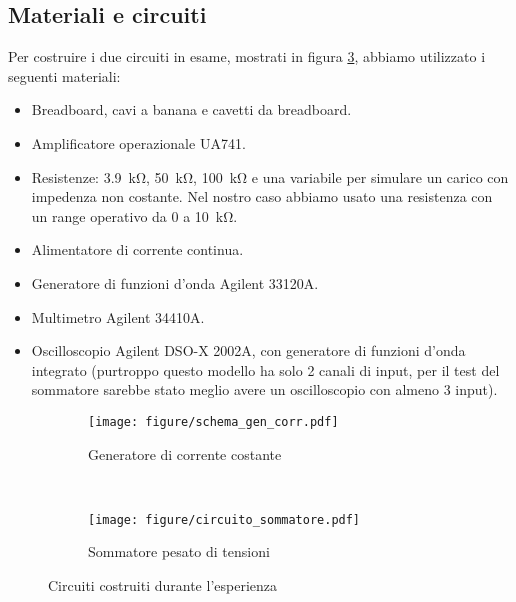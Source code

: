 \subsection{Materiali e circuiti}

Per costruire i due circuiti in esame, mostrati in figura \ref{fig:circuits1},
abbiamo utilizzato i seguenti materiali:

\begin{itemize}
    \item{Breadboard, cavi a banana e cavetti da breadboard.}
    \item{Amplificatore operazionale UA741.}
    \item{Resistenze: \SI{3.9}{\kilo\ohm}, \SI{50}{\kilo\ohm}, \SI{100}{\kilo\ohm}
        e una variabile per simulare un carico con impedenza non costante. Nel nostro caso abbiamo
        usato una resistenza con un range operativo da 0 a \SI{10}{\kilo\ohm}.}
    \item{Alimentatore di corrente continua.}
    \item{Generatore di funzioni d'onda Agilent 33120A.}
    \item{Multimetro Agilent 34410A.}
    \item{Oscilloscopio Agilent DSO-X 2002A, con generatore di funzioni d'onda integrato
        (purtroppo questo modello ha solo 2 canali di input,
        per il test del sommatore sarebbe stato meglio avere un oscilloscopio con almeno 3 input).}
\end{itemize}

\begin{figure}[h]
        \centering
        \begin{subfigure}[b]{0.48\textwidth}
                \texttt{[image: figure/schema\_gen\_corr.pdf]}
                \caption{Generatore di corrente costante}
                \label{fig:generatore1}
        \end{subfigure}
        ~
        \begin{subfigure}[b]{0.48\textwidth}
                \texttt{[image: figure/circuito\_sommatore.pdf]}
                \caption{Sommatore pesato di tensioni}
                \label{fig:sommatore1}
        \end{subfigure}
        \caption{Circuiti costruiti durante l'esperienza}
        \label{fig:circuits1}
\end{figure}

